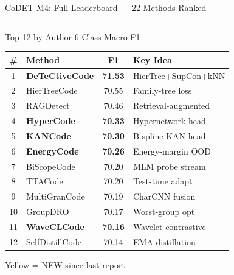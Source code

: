 \documentclass[aspectratio=169, 10pt]{beamer}
\begin{document}
\begin{frame}{CoDET-M4: Full Leaderboard --- 22 Methods Ranked}
\vspace{-0.25cm}
\begin{columns}[T]
\begin{block}{Top-12 by Author 6-Class Macro-F1}
\centering\scriptsize
\begin{tabular}{clcl}
\toprule
\textbf{\#} & \textbf{Method} & \textbf{F1} & \textbf{Key Idea} \\
\midrule
\rowcolor{oursgreen}
1 & \textbf{DeTeCtiveCode} & \textbf{71.53} & HierTree+SupCon+kNN \\
2 & HierTreeCode & 70.55 & Family-tree loss \\
3 & RAGDetect & 70.46 & Retrieval-augmented \\
\rowcolor{newbg}
4 & \textbf{HyperCode} & \textbf{70.33} & Hypernetwork head \\
\rowcolor{newbg}
5 & \textbf{KANCode} & \textbf{70.30} & B-spline KAN head \\
\rowcolor{newbg}
6 & \textbf{EnergyCode} & \textbf{70.26} & Energy-margin OOD \\
7 & BiScopeCode & 70.20 & MLM probe stream \\
8 & TTACode & 70.20 & Test-time adapt \\
9 & MultiGranCode & 70.19 & CharCNN fusion \\
10 & GroupDRO & 70.17 & Worst-group opt \\
\rowcolor{newbg}
11 & \textbf{WaveCLCode} & \textbf{70.16} & Wavelet contrastive \\
12 & SelfDistillCode & 70.14 & EMA distillation \\
\bottomrule
\end{tabular}
{\tiny \colorbox{newbg}{Yellow} = NEW since last report}
\end{block}


\end{columns}
\end{frame}
\end{document}
